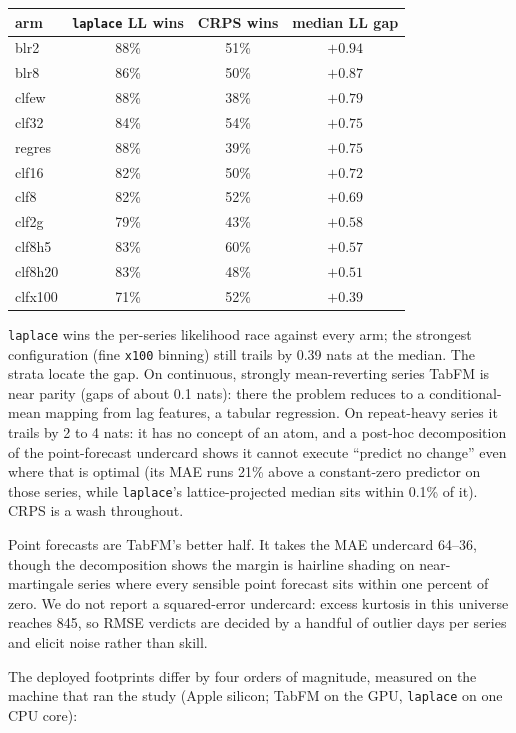 \documentclass[article]{jss}
\providecommand{\code}[1]{\texttt{#1}}
\begin{document}
\begin{center}
\begin{tabular}{lccc}
\hline
arm & \code{laplace} LL wins & CRPS wins & median LL gap \\
\hline
blr2    & 88\% & 51\% & $+0.94$ \\
blr8    & 86\% & 50\% & $+0.87$ \\
clfew   & 88\% & 38\% & $+0.79$ \\
clf32   & 84\% & 54\% & $+0.75$ \\
regres  & 88\% & 39\% & $+0.75$ \\
clf16   & 82\% & 50\% & $+0.72$ \\
clf8    & 82\% & 52\% & $+0.69$ \\
clf2g   & 79\% & 43\% & $+0.58$ \\
clf8h5  & 83\% & 60\% & $+0.57$ \\
clf8h20 & 83\% & 48\% & $+0.51$ \\
clfx100 & 71\% & 52\% & $+0.39$ \\
\hline
\end{tabular}
\end{center}

\code{laplace} wins the per-series likelihood race against every arm; the
strongest configuration (fine \code{x100} binning) still trails by 0.39
nats at the median. The strata locate the gap. On continuous, strongly
mean-reverting series TabFM is near parity (gaps of about 0.1 nats):
there the problem reduces to a conditional-mean mapping from lag
features, a tabular regression. On repeat-heavy series it trails by 2 to
4 nats: it has no concept of an atom, and a post-hoc decomposition of the
point-forecast undercard shows it cannot execute ``predict no change''
even where that is optimal (its MAE runs 21\% above a constant-zero
predictor on those series, while \code{laplace}'s lattice-projected
median sits within 0.1\% of it). CRPS is a wash throughout.

Point forecasts are TabFM's better half. It takes the MAE undercard
64--36, though the decomposition shows the margin is hairline shading on
near-martingale series where every sensible point forecast sits within
one percent of zero. We do not report a squared-error undercard: excess
kurtosis in this universe reaches 845, so RMSE verdicts are decided by a
handful of outlier days per series and elicit noise rather than skill.

The deployed footprints differ by four orders of magnitude, measured on
the machine that ran the study (Apple silicon; TabFM on the GPU,
\code{laplace} on one CPU core):
\end{document}
